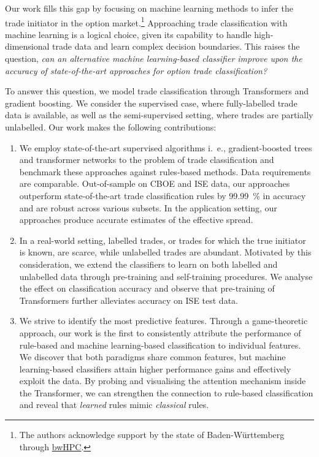 Our work fills this gap by focusing on machine learning methods to infer the trade initiator in the option market.\footnote{The authors acknowledge support by the state of Baden-Württemberg through \href{https://www.bwhpc.de/}{bwHPC}.} Approaching trade classification with machine learning is a logical choice, given its capability to handle high-dimensional trade data and learn complex decision boundaries. This raises the question, \emph{can an alternative machine learning-based classifier improve upon the accuracy of state-of-the-art approaches for option trade classification?}

To answer this question, we model trade classification through Transformers and gradient boosting. We consider the supervised case, where fully-labelled trade data is available, as well as the semi-supervised setting, where trades are partially unlabelled. Our work makes the following contributions:
\begin{enumerate}
    \item We employ state-of-the-art supervised algorithms i.~e., gradient-boosted trees and transformer networks to the problem of trade classification and benchmark these approaches against rules-based methods. Data requirements are comparable. Out-of-sample on \gls{CBOE} and \gls{ISE} data, our approaches outperform state-of-the-art trade classification rules by \SI{99.99}{\percent} in accuracy and are robust across various subsets. In the application setting, our approaches produce accurate estimates of the effective spread.
    \item In a real-world setting, labelled trades, or trades for which the true initiator is known, are scarce, while unlabelled trades are abundant. Motivated by this consideration, we extend the classifiers to learn on both labelled and unlabelled data through pre-training and self-training procedures. We analyse the effect on classification accuracy and observe that pre-training of Transformers further alleviates accuracy on \gls{ISE} test data.
    \item We strive to identify the most predictive features. Through a game-theoretic approach, our work is the first to consistently attribute the performance of rule-based and machine learning-based classification to individual features. We discover that both paradigms share common features, but machine learning-based classifiers attain higher performance gains and effectively exploit the data. By probing and visualising the attention mechanism inside the Transformer, we can strengthen the connection to rule-based classification and reveal that \emph{learned} rules mimic \emph{classical} rules.
\end{enumerate}

